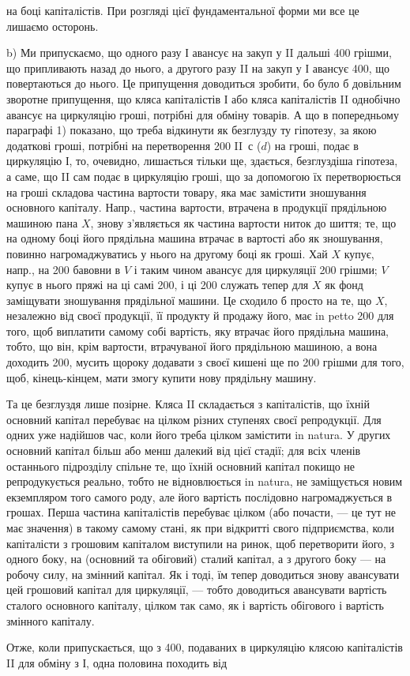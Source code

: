 \parcont{}  %
на боці капіталістів. При розгляді цієї фундаментальної форми ми все це
лишаємо осторонь.

\medskip{}
b) Ми припускаємо, що одного разу І авансує на закуп у II дальші
400 грішми, що припливають назад до нього, а другого разу
II на закуп у І авансує 400, що повертаються до нього. Це
припущення доводиться зробити, бо було б довільним зворотне припущення,
що кляса капіталістів І або кляса капіталістів II однобічно авансує
на циркуляцію гроші, потрібні для обміну товарів. А що в попередньому
параграфі 1) показано, що треба відкинути як безглузду ту гіпотезу, за
якою додаткові гроші, потрібні на перетворення 200 II~$с$ ($d$) на гроші,
подає в циркуляцію І, то, очевидно, лишається тільки ще, здається, безглуздіша
гіпотеза, а саме, що II сам подає в циркуляцію гроші, що за допомогою
їх перетворюється на гроші складова частина вартости товару,
яка має замістити зношування основного капіталу. Напр., частина вартости,
втрачена в продукції прядільною машиною пана $X$, знову з’являється
як частина вартости ниток до шиття; те, що на одному боці його прядільна
машина втрачає в вартості або як зношування, повинно нагромаджуватись
у нього на другому боці як гроші. Хай $X$ купує, напр., на
200 бавовни в $V$ і таким чином авансує для циркуляції 200 грішми; $V$ купує в нього пряжі на ці самі 200, і ці
200 служать тепер для $X$ як фонд заміщувати зношування прядільної
машини. Це сходило б просто на те, що $X$, незалежно від своєї
продукції, її продукту й продажу його, має in petto 200 для
того, щоб виплатити самому собі вартість, яку втрачає його прядільна
машина, тобто, що він, крім вартости, втрачуваної його прядільною машиною,
а вона доходить 200, мусить щороку додавати з своєї
кишені ще по 200 грішми для того, щоб, кінець-кінцем, мати
змогу купити нову прядільну машину.

Та це безглуздя лише позірне. Кляса II складається з капіталістів,
що їхній основний капітал перебуває на цілком різних ступенях своєї
репродукції. Для одних уже надійшов час, коли його треба цілком замістити
in natura. У других основний капітал більш або менш далекий
від цієї стадії; для всіх членів останнього підрозділу спільне те, що їхній
основний капітал покищо не репродукується реально, тобто не відновлюється
in natura, не заміщується новим екземпляром того самого роду,
але його вартість послідовно нагромаджується в грошах. Перша частина
капіталістів перебуває цілком (або почасти, — це тут не має значення)
в такому самому стані, як при відкритті свого підприємства, коли капіталісти
з грошовим капіталом виступили на ринок, щоб перетворити його,
з одного боку, на (основний та обіговий) сталий капітал, а з другого
боку — на робочу силу, на змінний капітал. Як і тоді, їм тепер доводиться
знову авансувати цей грошовий капітал для циркуляції, — тобто доводиться
авансувати вартість сталого основного капіталу, цілком так само, як і вартість
обігового і вартість змінного капіталу.

Отже, коли припускається, що з 400, подаваних в циркуляцію
клясою капіталістів II для обміну з І, одна половина походить від
\parbreak{}  %
